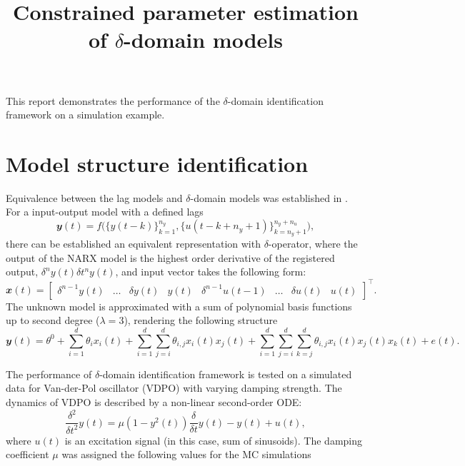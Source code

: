 \documentclass[a4paper,11pt,twoside]{article}
\title{Constrained parameter estimation of $\delta$-domain models}
\def\order{3}
\theoremstyle{mytheoremstyle}
\begin{document}
	\maketitle
\par This report demonstrates the performance of the $\delta$-domain identification framework on a simulation example.
\section{Model structure identification}
\par Equivalence between the lag models and $\delta$-domain models was established in \cite{ANDERSON20071859}. For a input-output model with a defined lags
\begin{equation}
	\mathbfit{y}(t) = f\big( \{y(t - k)\}^{n_y}_{k=1}, \{u(t - k + n_y + 1)\}^{n_y + n_u}_{k= n_y + 1} \big),
\end{equation}
there can be established an equivalent representation with $\delta$-operator, where the output of the NARX model is the highest order derivative of the registered output, $\delta^{n} y(t)\delta t^{n} y(t)$, and input vector takes the following form:
\begin{equation}
\mathbfit{x}(t) = \left[\begin{array}{cccccccc}
\delta^{n-1} y(t) & \dots & \delta y(t) & y(t) & \delta^{n-1}u(t-1) & \dots  & \delta u(t) & u(t)
\end{array}\right]^{\top}.
\end{equation}
The unknown model is approximated with a sum of polynomial basis functions up to second degree ($\lambda = \order$), rendering the following structure
\begin{equation}\label{eq:narx}
	\mathbfit{y}(t) = \theta^0 + \sum_{i=1}^{d} \theta_i x_i(t) + \sum_{i=1}^{d} \sum_{j=i}^{d} \theta_{i,j} x_i(t) x_j(t) +  \sum_{i=1}^{d} \sum_{j=i}^{d} \sum_{k=j}^{d} \theta_{i,j} x_i(t) x_j(t) x_k(t) + e(t).
\end{equation}
\par The performance of $\delta$-domain identification framework is tested on a simulated data for Van-der-Pol oscillator (VDPO) with varying damping strength. The dynamics of VDPO is described by a non-linear second-order ODE:
\begin{equation}
\frac{\delta^2}{\delta t^2} y(t) = \mu(1 - y^2(t))\frac{\delta}{\delta t} y(t) - y(t) + u(t),
\end{equation} 
where $u(t)$ is an excitation signal (in this case, sum of sinusoids). The damping coefficient $\mu$ was assigned the following values for the MC simulations
\end{document}

